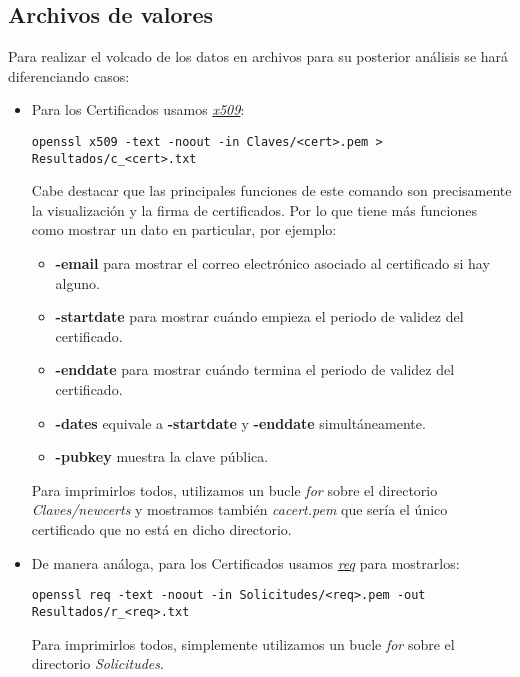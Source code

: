 \documentclass[a4paper, 11pt]{article}
\begin{document}
	\subsection{Archivos de valores}
		Para realizar el volcado de los datos en archivos para su posterior análisis se hará diferenciando casos:
		\begin{itemize}
			\item Para los Certificados usamos \href{https://www.openssl.org/docs/man1.0.2/apps/x509.html}{\textit{x509}}:\\
			\begin{small}
				\verb|openssl x509 -text -noout -in Claves/<cert>.pem > Resultados/c_<cert>.txt|\\
			\end{small}
			
			Cabe destacar que las principales funciones de este comando son precisamente la visualización y la firma de
			certificados. Por lo que tiene más funciones como mostrar un dato en particular, por ejemplo:
			\begin{itemize}
				\item \textbf{-email} para mostrar el correo electrónico asociado al certificado si hay alguno.
				\item \textbf{-startdate} para mostrar cuándo empieza el periodo de validez del certificado.
				\item \textbf{-enddate} para mostrar cuándo termina el periodo de validez del certificado.
				\item \textbf{-dates} equivale a \textbf{-startdate} y \textbf{-enddate} simultáneamente.
				\item \textbf{-pubkey} muestra la clave pública.
			\end{itemize}
			
			Para imprimirlos todos, utilizamos un bucle \textit{for} sobre el directorio \textit{Claves/newcerts} y mostramos
			también \textit{cacert.pem} que sería el único certificado que no está en dicho directorio.
			
			\item De manera análoga, para los Certificados usamos \href{https://www.openssl.org/docs/man1.0.2/apps/req.html}
			{\textit{req}} para mostrarlos:\\
			\begin{small}
				\verb|openssl req -text -noout -in Solicitudes/<req>.pem -out Resultados/r_<req>.txt|\\
			\end{small}
			
			Para imprimirlos todos, simplemente utilizamos un bucle \textit{for} sobre el directorio \textit{Solicitudes}.
		\end{itemize}
		
\end{document}
